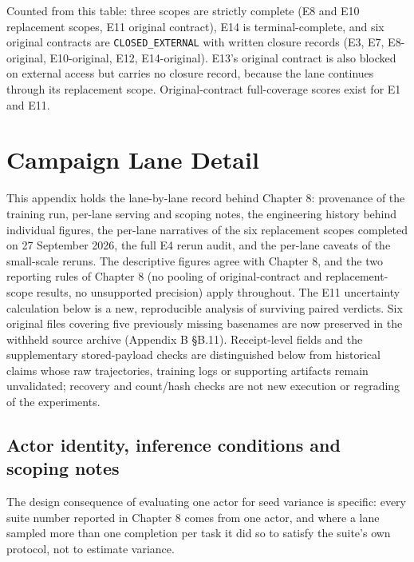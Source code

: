 \documentclass[12pt,a4paper]{report}
\begin{document}
Counted from this table: three scopes are strictly complete (E8 and E10
replacement scopes, E11 original contract), E14 is terminal-complete,
and six original contracts are \texttt{CLOSED\_EXTERNAL} with written
closure records (E3, E7, E8-original, E10-original, E12, E14-original).
E13's original contract is also blocked on external access but carries
no closure record, because the lane continues through its replacement
scope. Original-contract full-coverage scores exist for E1 and E11.



\chapter{Campaign Lane Detail}\label{campaign-lane-detail}

This appendix holds the lane-by-lane record behind Chapter 8: provenance
of the training run, per-lane serving and scoping notes, the engineering
history behind individual figures, the per-lane narratives of the six
replacement scopes completed on 27 September 2026, the full E4 rerun
audit, and the per-lane caveats of the small-scale reruns. The
descriptive figures agree with Chapter 8, and the two reporting rules of
Chapter 8 (no pooling of original-contract and replacement-scope
results, no unsupported precision) apply throughout. The E11 uncertainty
calculation below is a new, reproducible analysis of surviving paired
verdicts. Six original files covering five previously missing basenames
are now preserved in the withheld source archive (Appendix B §B.11).
Receipt-level fields and the supplementary stored-payload checks are
distinguished below from historical claims whose raw trajectories,
training logs or supporting artifacts remain unvalidated; recovery and
count/hash checks are not new execution or regrading of the experiments.

\section{Actor identity, inference conditions and scoping
notes}\label{actor-identity-inference-conditions-and-scoping-notes}

The design consequence of evaluating one actor for seed variance is
specific: every suite number reported in Chapter 8 comes from one actor,
and where a lane sampled more than one completion per task it did so to
satisfy the suite's own protocol, not to estimate variance.
\end{document}
